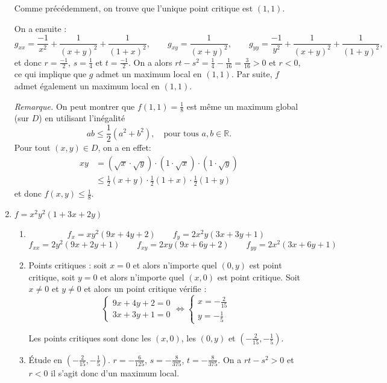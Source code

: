 \documentclass[11pt,a4paper]{article}
\theoremstyle{exostyle}
\begin{document}
\begin{enumerate}
	Comme précédemment, on trouve que l'unique point critique est $(1,1)$. 
	
	On a ensuite :
	\[
	g_{xx} = \frac{-1}{x^2}+\frac{1}{(x+y)^2} + \frac{1}{(1+x)^2}, \qquad g_{xy} = \frac{1}{(x+y)^2}, \qquad g_{yy}= \frac{-1}{y^2}+\frac{1}{(x+y)^2} + \frac{1}{(1+y)^2},
	\]		
	et donc $r=\frac{-1}{2}$, $s=\frac{1}{4}$ et $t=\frac{-1}{2}$. On a alors $rt-s^2 = \frac{1}{4} - \frac{1}{16} = \frac{3}{16} >0$ et $r<0$, ce qui implique que $g$ admet un maximum local en $(1,1)$. Par suite, $f$ admet également un maximum local en $(1,1)$.
	
	\emph{Remarque.} On peut montrer que $f(1,1) = \frac{1}{8}$ est même un maximum global (sur $D$) en utilisant l'inégalité
	\[
	ab \leq \frac{1}{2}(a^2+b^2), \quad \text{pour tous } a,b \in \mathbb{R}.
	\]
	Pour tout $(x,y) \in D$, on a en effet:
	\begin{align*}
		xy & = (\sqrt{x} \cdot \sqrt{y}) \cdot (1 \cdot \sqrt{x}) \cdot (1 \cdot \sqrt{y}) \\
		& \leq \frac{1}{2}(x+y) \cdot \frac{1}{2}(1+x) \cdot \frac{1}{2}(1+y)
	\end{align*}
	et donc $f(x,y) \leq \frac{1}{8}$.
	
	

	\item $f = x^2y^2(1+3x+2y)$
	
	\begin{enumerate}
	\item	
	\[
	f_x = xy^2(9x+4y+2)
	\qquad
	f_y = 2x^2y(3x+3y+1)
	\]
	\[
	f_{xx} = 2y^2(9x+2y+1)
	\qquad 
	f_{xy}= 2xy(9x+6y+2)
	\qquad 
	f_{yy}= 2x^2(3x+6y+1)
	\]
	
	\item Points critiques : soit $x=0$ et alors n'importe quel $(0,y)$ est point critique, 
	soit $y=0$ et alors n'importe quel $(x,0)$ est point critique.
	Soit $x\neq0$ et $y\neq0$ et alors un point critique vérifie :
	\[
	\left\{
	\begin{array}{l}
		9x+4y+2 = 0 \\
		3x+3y+1 = 0 
	\end{array}
	\right.
	\iff
	\left\{
	\begin{array}{l}
		x = -\frac{2}{15} \\
		y = -\frac{1}{5} 
	\end{array}
	\right.	
	\]
	
	Les points critiques sont donc les $(x,0)$, les $(0,y)$ et $(-\frac{2}{15},-\frac{1}{5})$.
	
	\item Étude en $(-\frac{2}{15},-\frac{1}{5})$.
	$r = -\frac{6}{125}$, $s = -\frac{8}{375}$, $t = -\frac{8}{375}$. On a $rt-s^2>0$ et $r<0$ il s'agit donc d'un maximum local.
	

\end{enumerate}
\end{enumerate}
\end{document}
